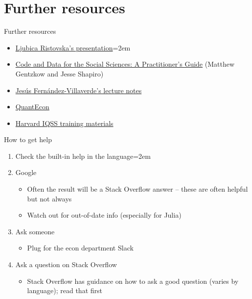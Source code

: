 \documentclass[handout]{beamer}
\begin{document}
\section{Further resources}
\begin{frame}{Further resources}
\begin{itemize}
    \item \href{https://scholar.harvard.edu/ristovska/resources}{Ljubica Ristovska's presentation}\itemsep=2em
    \item \href{https://web.stanford.edu/~gentzkow/research/CodeAndData.pdf}{Code and Data for the Social Sciences: A Practitioner's Guide} (Matthew Gentzkow and Jesse Shapiro)
    \item \href{https://www.sas.upenn.edu/~jesusfv/teaching.html}{Jesús Fernández-Villaverde's lecture notes}
    \item \href{https://quantecon.org/}{QuantEcon}
    \item \href{https://www.iq.harvard.edu/data-science-services/workshop-materials}{Harvard IQSS training materials}
\end{itemize}
\end{frame}

\begin{frame}{How to get help}

\begin{enumerate}
    \item Check the built-in help in the language\itemsep=2em
    \item Google
    \begin{itemize}
        \item Often the result will be a Stack Overflow answer -- these are often helpful but not always
        \item Watch out for out-of-date info (especially for Julia)
    \end{itemize}
    \item Ask someone
    \begin{itemize}
        \item Plug for the econ department Slack
    \end{itemize}
    \item Ask a question on Stack Overflow
    \begin{itemize}
        \item Stack Overflow has guidance on how to ask a good question (varies by language); read that first
    \end{itemize}
\end{enumerate}
\end{frame}
\end{document}
